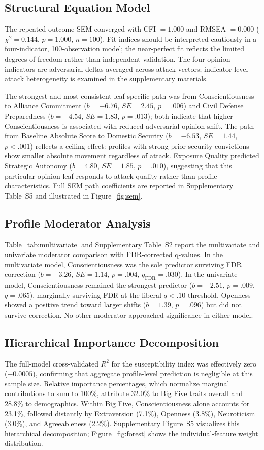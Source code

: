\documentclass[11pt]{article}
\begin{document}
\subsection{Structural Equation Model}
The repeated-outcome SEM converged with CFI $= 1.000$ and RMSEA $= 0.000$ ($\chi^2 = 0.144$, $p = 1.000$, $n = 100$).
Fit indices should be interpreted cautiously in a four-indicator, 100-observation model; the near-perfect fit reflects the limited degrees of freedom rather than independent validation.
The four opinion indicators are adversarial deltas averaged across attack vectors; indicator-level attack heterogeneity is examined in the supplementary materials.

The strongest and most consistent leaf-specific path was from Conscientiousness to Alliance Commitment ($b = -6.76$, $SE = 2.45$, $p = .006$) and Civil Defense Preparedness ($b = -4.54$, $SE = 1.83$, $p = .013$); both indicate that higher Conscientiousness is associated with reduced adversarial opinion shift.
The path from Baseline Absolute Score to Domestic Security ($b = -6.53$, $SE = 1.44$, $p < .001$) reflects a ceiling effect: profiles with strong prior security convictions show smaller absolute movement regardless of attack.
Exposure Quality predicted Strategic Autonomy ($b = 4.80$, $SE = 1.85$, $p = .010$), suggesting that this particular opinion leaf responds to attack quality rather than profile characteristics.
Full SEM path coefficients are reported in Supplementary Table~S5 and illustrated in Figure~\ref{fig:sem}.

\subsection{Profile Moderator Analysis}
Table~\ref{tab:multivariate} and Supplementary Table~S2 report the multivariate and univariate moderator comparison with FDR-corrected q-values.
In the multivariate model, Conscientiousness was the sole predictor surviving FDR correction ($b = -3.26$, $SE = 1.14$, $p = .004$, $q_{\mathrm{FDR}} = .030$).
In the univariate model, Conscientiousness remained the strongest predictor ($b = -2.51$, $p = .009$, $q = .065$), marginally surviving FDR at the liberal $q < .10$ threshold.
Openness showed a positive trend toward larger shifts ($b = 1.39$, $p = .096$) but did not survive correction.
No other moderator approached significance in either model.

\subsection{Hierarchical Importance Decomposition}
The full-model cross-validated $R^2$ for the susceptibility index was effectively zero ($-0.0005$), confirming that aggregate profile-level prediction is negligible at this sample size.
Relative importance percentages, which normalize marginal contributions to sum to 100\%, attribute 32.0\% to Big Five traits overall and 28.8\% to demographics.
Within Big Five, Conscientiousness alone accounts for 23.1\%, followed distantly by Extraversion (7.1\%), Openness (3.8\%), Neuroticism (3.0\%), and Agreeableness (2.2\%).
Supplementary Figure~S5 visualizes this hierarchical decomposition; Figure~\ref{fig:forest} shows the individual-feature weight distribution.
\end{document}
